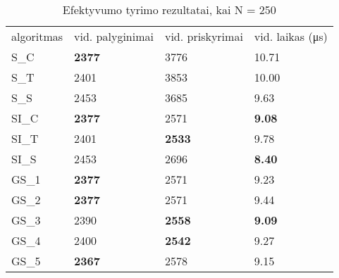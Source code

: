\documentclass{VUMIFInfKursinis}
\begin{document}
\begin{table}[H]
  \caption{Efektyvumo tyrimo rezultatai, kai N = 250}
  \label{results_250}
  \centering
  \begin{tabular}{@{}llll@{}}
  algoritmas & vid. palyginimai                      & vid. priskyrimai                      & vid. laikas (μs)                      \\
  S\_C       & \cellcolor[HTML]{70AD47}\textbf{2377} & 3776                                  & 10.71                                 \\
  S\_T       & 2401                                  & 3853                                  & 10.00                                 \\
  S\_S       & 2453                                  & 3685                                  & 9.63                                  \\
  SI\_C      & \cellcolor[HTML]{70AD47}\textbf{2377} & 2571                                  & \cellcolor[HTML]{70AD47}\textbf{9.08} \\
  SI\_T      & 2401                                  & \cellcolor[HTML]{70AD47}\textbf{2533} & 9.78                                  \\
  SI\_S      & 2453                                  & 2696                                  & \cellcolor[HTML]{70AD47}\textbf{8.40} \\
  GS\_1      & \cellcolor[HTML]{70AD47}\textbf{2377} & 2571                                  & 9.23                                  \\
  GS\_2      & \cellcolor[HTML]{70AD47}\textbf{2377} & 2571                                  & 9.44                                  \\
  GS\_3      & 2390                                  & \cellcolor[HTML]{70AD47}\textbf{2558} & \cellcolor[HTML]{70AD47}\textbf{9.09} \\
  GS\_4      & 2400                                  & \cellcolor[HTML]{70AD47}\textbf{2542} & 9.27                                  \\
  GS\_5      & \cellcolor[HTML]{70AD47}\textbf{2367} & 2578                                  & 9.15                                 
  \end{tabular}
\end{table}
\end{document}
